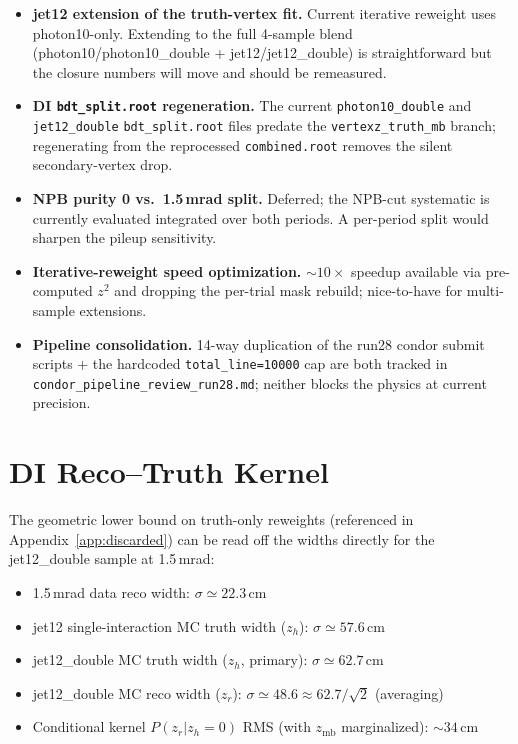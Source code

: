 \documentclass[11pt,a4paper]{article}
\begin{document}
\begin{itemize}
\item \textbf{jet12 extension of the truth-vertex fit.} Current
  iterative reweight uses photon10-only. Extending to the full
  4-sample blend (photon10/photon10\_double + jet12/jet12\_double)
  is straightforward but the closure numbers will move and should
  be remeasured.
\item \textbf{DI \texttt{bdt\_split.root} regeneration.} The
  current \texttt{photon10\_double} and \texttt{jet12\_double}
  \texttt{bdt\_split.root} files predate the
  \texttt{vertexz\_truth\_mb} branch; regenerating from the
  reprocessed \texttt{combined.root} removes the silent
  secondary-vertex drop.
\item \textbf{NPB purity 0 vs.\ 1.5\,mrad split.} Deferred; the
  NPB-cut systematic is currently evaluated integrated over both
  periods. A per-period split would sharpen the pileup sensitivity.
\item \textbf{Iterative-reweight speed optimization.} $\sim\!10\times$
  speedup available via pre-computed $z^2$ and dropping the
  per-trial mask rebuild; nice-to-have for multi-sample extensions.
\item \textbf{Pipeline consolidation.} 14-way duplication of the
  run28 condor submit scripts + the hardcoded
  \texttt{total\_line=10000} cap are both tracked in
  \texttt{condor\_pipeline\_review\_run28.md}; neither blocks the
  physics at current precision.
\end{itemize}


\appendix
\section{DI Reco--Truth Kernel}
\label{app:double_diag}

The geometric lower bound on truth-only reweights (referenced in
Appendix~\ref{app:discarded}) can be read off the widths directly
for the jet12\_double sample at 1.5\,mrad:

\begin{itemize}\setlength\itemsep{1pt}
\item 1.5\,mrad data reco width: $\sigma \simeq 22.3$\,cm
\item jet12 single-interaction MC truth width ($z_h$): $\sigma \simeq 57.6$\,cm
\item jet12\_double MC truth width ($z_h$, primary): $\sigma \simeq 62.7$\,cm
\item jet12\_double MC reco width ($z_r$):
      $\sigma \simeq 48.6 \approx 62.7/\sqrt 2$ (averaging)
\item Conditional kernel $P(z_r|z_h=0)$ RMS (with $z_\mathrm{mb}$
      marginalized): $\sim\!34$\,cm
\end{itemize}
\end{document}
